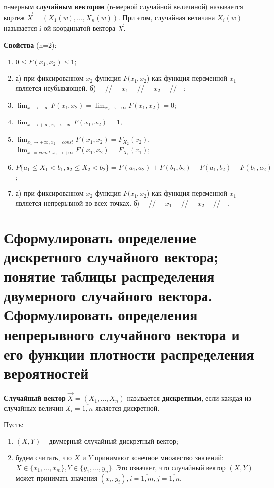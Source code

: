 n-мерным \textbf{случайным вектором} (n-мерной случайной величиной) называется кортеж $\vec{X} = (X_1(w), ..., X_n(w))$. При этом, случайная величина $X_i(w)$ называется i-ой координатой вектора $\vec{X}$.

\textbf{Свойства} (n=2):
\begin{enumerate}
	\item $0 \leq F(x_1, x_2) \leq 1$;
	\item а) при фиксированном $x_2$ функция $F(x_1, x_2$) как функция переменной $x_1$ является неубывающей. б) ---//--- $x_1$ ---//--- $x_2$ ---//---;
	\item $\lim_{x_1 \to -\infty} F(x_1, x_2) = \lim_{x_2 \to -\infty} F(x_1, x_2) = 0$;
	\item $\lim_{x_1 \to +\infty, x_2 \to +\infty} F(x_1, x_2) = 1$;
	\item $\lim_{x_1 \to +\infty, x_2 = const} F(x_1, x_2) = F_{X_2}(x_2)$, $\lim_{x_1 = const, x_1 \to +\infty} F(x_1, x_2) = F_{X_1}(x_1)$;
	\item $P\{a_1 \leq X_1 < b_1, a_2 \leq X_2 < b_2\} = F(a_1, a_2) + F(b_1, b_2) - F(a_1, b_2) - F(b_1, a_2)$;
	\item а) при фиксированном $x_2$ функция $F(x_1, x_2$) как функция переменной $x_1$ является непрерывной во всех точках. б) ---//--- $x_1$ ---//--- $x_2$ ---//---.
\end{enumerate}

\section{Сформулировать определение дискретного случайного вектора; понятие таблицы распределения двумерного случайного вектора. Сформулировать определения непрерывного случайного вектора и его функции плотности распределения вероятностей}

\textbf{Случайный вектор} $\vec{X} = (X_1, ..., X_n)$ называется \textbf{дискретным}, если каждая из случайных величин $X_i = \overline{1, n}$ является дискретной.

Пусть:
\begin{enumerate}
	\item $(X, Y)$ -- двумерный случайный дискретный вектор;
	\item будем считать, что $X$ и $Y$ принимают конечное множество значений: $X \in \{x_1, ..., x_m\}, Y \in \{y_1, ..., y_n\}$. Это означает, что случайный вектор $(X, Y)$ может принимать значения $(x_i, y_i), i = \overline{1, m}, j = \overline{1, n}$.
\end{enumerate}

